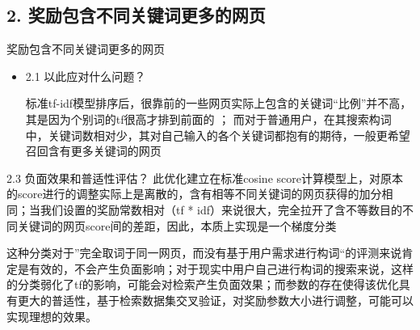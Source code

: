 \documentclass[12pt]{beamer}
\begin{document}
\subsection{2. 奖励包含不同关键词更多的网页} %
\begin{frame}{奖励包含不同关键词更多的网页}
\begin{itemize}
\item 2.1 以此应对什么问题？

标准tf-idf模型排序后，很靠前的一些网页实际上包含的关键词“比例”并不高，\alert{其是因为个别词的tf很高才排到前面的} ；
而对于普通用户，在其搜索构词中，关键词数相对少，其对自己输入的各个关键词都抱有的期待，\alert{一般更希望召回含有更多关键词的网页}
\end{itemize}

 
\end{frame}
\begin{frame}{2.3 负面效果和普适性评估？}
此优化建立在标准cosine score计算模型上，对原本的score进行的调整实际上是\alert{离散}的，含有相等不同关键词的网页获得的加分相同；当我们设置的奖励常数相对（tf * idf）来说很大，完全拉开了含不等数目的不同关键词的网页score间的差距，因此，\alert{本质上实现是一个梯度分类}

这种分类对于”完全取词于同一网页，而没有基于用户需求进行构词“的评测来说肯定是有效的，不会产生负面影响；对于现实中用户自己进行构词的搜索来说，这样的分类弱化了tf的影响，可能会对检索产生负面效果；而参数的存在使得该优化具有更大的普适性，基于检索数据集交叉验证，对奖励参数大小进行调整，可能可以实现理想的效果。
\end{frame}
\end{document}

